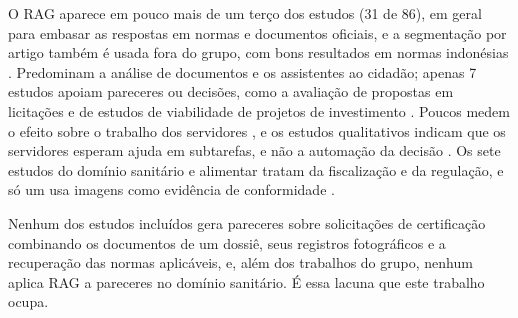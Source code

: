 O RAG aparece em pouco mais de um terço dos estudos (31 de 86), em geral para embasar as respostas em normas e documentos oficiais, e a segmentação por artigo também é usada fora do grupo, com bons resultados em normas indonésias \cite{Fiddina2026}. Predominam a análise de documentos e os assistentes ao cidadão; apenas 7 estudos apoiam pareceres ou decisões, como a avaliação de propostas em licitações \cite{Zeng2026} e de estudos de viabilidade de projetos de investimento \cite{Sheng2026}. Poucos medem o efeito sobre o trabalho dos servidores \cite{Kawashima2024}, e os estudos qualitativos indicam que os servidores esperam ajuda em subtarefas, e não a automação da decisão \cite{Drobotowicz2026}. Os sete estudos do domínio sanitário e alimentar tratam da fiscalização e da regulação, e só um usa imagens como evidência de conformidade \cite{Chernikov2025}.

Nenhum dos estudos incluídos gera pareceres sobre solicitações de certificação combinando os documentos de um dossiê, seus registros fotográficos e a recuperação das normas aplicáveis, e, além dos trabalhos do grupo, nenhum aplica RAG a pareceres no domínio sanitário. É essa lacuna que este trabalho ocupa.
